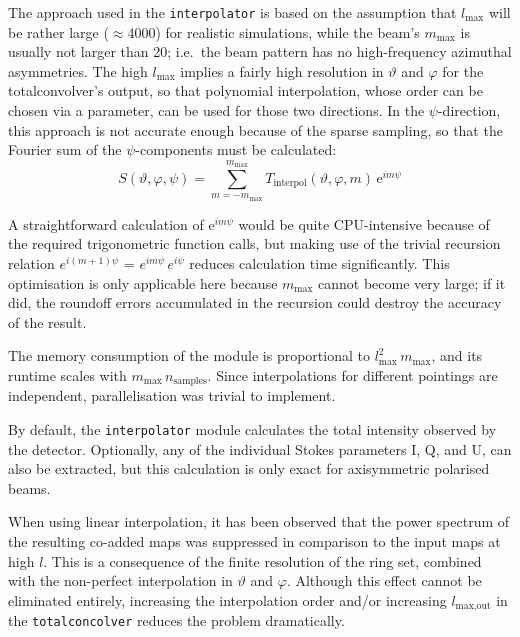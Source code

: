 \documentclass{aa}
\begin{document}
The approach used in the {\tt interpolator} is based on the assumption
that $l_{\text{max}}$ will be rather large ($\approx 4000$) for
realistic simulations, while the beam's $m_{\text{max}}$ is usually
not larger than 20; i.e.\ the beam pattern has no high-frequency
azimuthal asymmetries. The high $l_{\text{max}}$ implies a fairly
high resolution in $\vartheta$ and $\varphi$ for the totalconvolver's
output, so that polynomial interpolation, whose order can be chosen
via a parameter, can be used for those two directions. In the
$\psi$-direction, this approach is not accurate enough because of the
sparse sampling, so that the Fourier sum of the $\psi$-components must
be calculated:
\begin{equation}
  S(\vartheta,\varphi,\psi)=\sum_{m=-m_{\text{max}}}^{m_{\text{max}}}
  T_{\text{interpol}}(\vartheta,\varphi,m)\,\mathrm{e}^{im\psi}
\end{equation}

A straightforward calculation of $\mathrm{e}^{im\psi}$ would be quite
CPU-intensive because of the required trigonometric function calls,
but making use of the trivial recursion relation $e^{i(m+1)\psi}$ =
$e^{im\psi}$\,$e^{i\psi}$ reduces calculation time significantly. This
optimisation is only applicable here because $m_{\text{max}}$ cannot
become very large; if it did, the roundoff errors accumulated in the
recursion could destroy the accuracy of the result.

The memory consumption of the module is proportional to
$l_{\text{max}}^2\,m_{\text{max}}$, and its runtime scales with
$m_{\text{max}}\,n_{\text{samples}}$. Since interpolations for
different pointings are independent, parallelisation was trivial to implement.

By default, the {\tt interpolator} module calculates the total
intensity observed by the detector. Optionally, any of the individual
Stokes parameters I, Q, and U, can also be extracted, but this
calculation is only exact for axisymmetric polarised beams.

When using linear interpolation, it has been observed that the power
spectrum of the resulting co-added maps was suppressed in comparison to
the input maps at high $l$. This is a consequence of the finite
resolution of the ring set, combined with the non-perfect
interpolation in $\vartheta$ and $\varphi$. Although this effect
cannot be eliminated entirely, increasing the interpolation order
and/or increasing $l_{\text{max,out}}$ in the {\tt totalconcolver}
reduces the problem dramatically.
\end{document}
